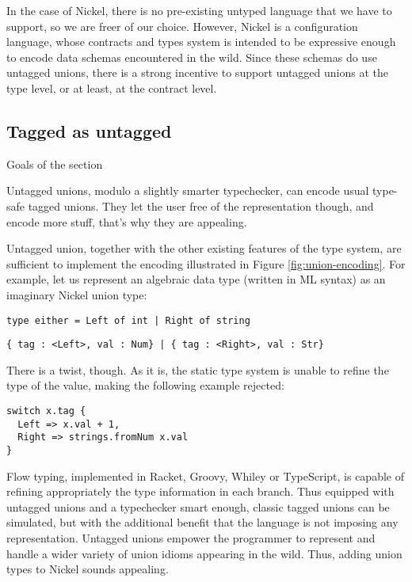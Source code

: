 \documentclass{article}
\begin{document}
In the case of Nickel, there is no pre-existing untyped language that we have to
support, so we are freer of our choice. However, Nickel is a configuration
language, whose contracts and types system is intended to be expressive enough
to encode data schemas encountered in the wild. Since these schemas do use
untagged unions, there is a strong incentive to support untagged unions at the
type level, or at least, at the contract level.

\subsection{Tagged as untagged}
{\color{red}Goals of the section

Untagged unions, modulo a slightly smarter typechecker, can encode usual type-safe
tagged unions. They let the user free of the representation though, and encode
more stuff, that's why they are appealing.\vspace{0.5cm}}

Untagged union, together with the other existing features of the type system,
are sufficient to implement the encoding illustrated in Figure
\ref{fig:union-encoding}. For example, let us represent an algebraic data type
(written in ML syntax) as an imaginary Nickel union type:

\begin{lstlisting}
type either = Left of int | Right of string
\end{lstlisting}

\begin{lstlisting}
{ tag : <Left>, val : Num} | { tag : <Right>, val : Str}
\end{lstlisting}

There is a twist, though. As it is, the static type system is unable to refine
the type of the value, making the following example rejected:

\begin{lstlisting}
switch x.tag {
  Left => x.val + 1,
  Right => strings.fromNum x.val
}
\end{lstlisting}

Flow typing, implemented in Racket\cite{FlowTypingRacket1, FlowTypingRacket2},
Groovy\cite{FlowTypingGroovy}, Whiley\cite{FlowTypingWhiley} or
TypeScript\cite{FlowTypingTypeScript}, is capable of refining appropriately the
type information in each branch. Thus equipped with untagged unions and a
typechecker smart enough, classic tagged unions can be simulated, but with the
additional benefit that the language is not imposing any representation.
Untagged unions empower the programmer to represent and handle a wider variety
of union idioms appearing in the wild.  Thus, adding union types to Nickel
sounds appealing.
\end{document}
